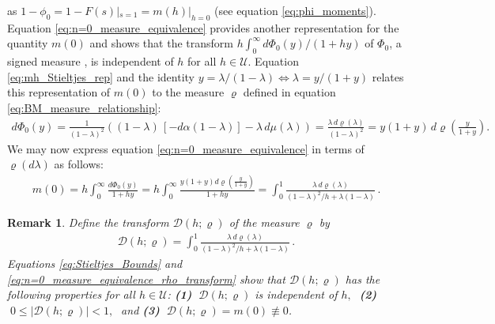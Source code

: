 \documentclass[english,12pt,jmp,graphicx]{revtex4-1}
\newtheorem{remark}{Remark}[section]
\newcommand{\ph}{\hat{\phi}}
\begin{document}
%
as $1-\phi_0=1-F(s)|_{s=1}=m(h)|_{h=0}$ (see equation
\eqref{eq:phi_moments}). Equation 
\eqref{eq:n=0_measure_equivalence} 
provides another representation for the quantity $m(0)$ and
shows that the transform $h\int_0^\infty d\Phi_0(y)/(1+hy)$ of $\Phi_0$, a signed
measure \cite{Rudin:87}, is independent of $h$ for all 
$h\in\mathcal{U}$. Equation \eqref{eq:mh_Stieltjes_rep} and the
identity $y=\lambda/(1-\lambda)\iff\lambda=y/(1+y)$ relates this representation of $m(0)$
to the measure $\varrho$ defined in equation \eqref{eq:BM_measure_relationship}:         
%
\begin{align*}%
  d\Phi_0(y)%
        =\frac{1}{(1-\lambda)^2}((1-\lambda)\,[-d\alpha(1-\lambda)]-\lambda\,d\mu(\lambda))
        =\frac{\lambda\,d\varrho(\lambda)}{(1-\lambda)^2}=y(1+y)\,d\varrho\left(\frac{y}{1+y}\right).%
\end{align*}
%
We may now express equation \eqref{eq:n=0_measure_equivalence}
in terms of $\varrho(d\lambda)$ as follows: 
%
\begin{align}\label{eq:n=0_measure_equivalence_rho_transform}
  m(0)= h\int_0^\infty\frac{d\Phi_0(y)}{1+hy}
      =h\int_0^\infty\frac{y(1+y)d\varrho(\frac{y}{1+y})}{1+hy}
      =\int_0^1\frac{\lambda\,d\varrho(\lambda)}{(1-\lambda)^2/h+\lambda(1-\lambda)}\,.
\end{align}
%
%
\begin{remark}\label{rem:varrho_conditions}
  Define the transform $\mathcal{D}(h;\varrho)$ of the measure $\varrho$ by
  \begin{align}\label{eq:D_varrho}
    \mathcal{D}(h;\varrho)=\int_0^1\frac{\lambda\,d\varrho(\lambda)}{(1-\lambda)^2/h+\lambda(1-\lambda)}\,.
  \end{align}
  Equations \eqref{eq:Stieltjes_Bounds} and 
  \eqref{eq:n=0_measure_equivalence_rho_transform}
  show that $\mathcal{D}(h;\varrho)$ has the following properties for
  all $h\in\mathcal{U}$:
  \newline
  \textbf{(1)} $\;\mathcal{D}(h;\varrho)$ is independent of $h,\;$ \textbf{(2)}
  $\;0\leq|\mathcal{D}(h;\varrho)|<1,\;$ and \textbf{(3)} $\;\mathcal{D}(h;\varrho)=m(0)\not\equiv0$. 
%  
\end{remark}
\end{document}
